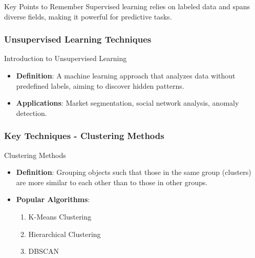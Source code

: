 \documentclass[aspectratio=169]{beamer}
\begin{document}
\begin{frame}[fragile]
    \begin{block}{Key Points to Remember}
        Supervised learning relies on labeled data and spans diverse fields, making it powerful for predictive tasks.
    \end{block}
\end{frame}

\begin{frame}
    \frametitle{Unsupervised Learning Techniques}
    \begin{block}{Introduction to Unsupervised Learning}
        \begin{itemize}
            \item \textbf{Definition}: A machine learning approach that analyzes data without predefined labels, aiming to discover hidden patterns.
            \item \textbf{Applications}: Market segmentation, social network analysis, anomaly detection.
        \end{itemize}
    \end{block}
\end{frame}

\begin{frame}
    \frametitle{Key Techniques - Clustering Methods}
    \begin{block}{Clustering Methods}
        \begin{itemize}
            \item \textbf{Definition}: Grouping objects such that those in the same group (clusters) are more similar to each other than to those in other groups.
            \item \textbf{Popular Algorithms}:
                \begin{enumerate}
                    \item K-Means Clustering
                    \item Hierarchical Clustering
                    \item DBSCAN
                \end{enumerate}
        \end{itemize}
    \end{block}
\end{frame}
\end{document}
